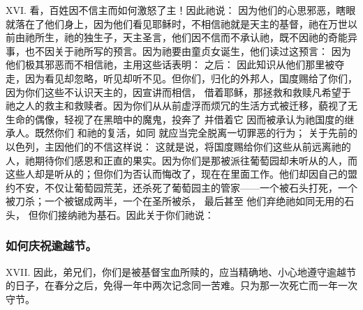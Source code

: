 XVI. 看，百姓因不信主而如何激怒了主！因此祂说： 因为他们的心思邪恶，瞎眼就落在了他们身上，因为他们看见耶稣时，不相信祂就是天主的基督，祂在万世以前由祂所生，祂的独生子，天主圣言，他们因不信而不承认祂，既不因祂的奇能异事，也不因关于祂所写的预言。因为祂要由童贞女诞生，他们读过这预言： 因为他们极其邪恶而不相信祂，主用这些话表明： 之后： 因此知识从他们那里被夺走，因为看见却忽略，听见却听不见。但你们，归化的外邦人，国度赐给了你们，因为你们这些不认识天主的，因宣讲而相信， 借着耶稣，那拯救和救赎凡希望于祂之人的救主和救赎者。因为你们从从前虚浮而烦冗的生活方式被迁移，藐视了无生命的偶像，轻视了在黑暗中的魔鬼，投奔了 并借着它 因而被承认为祂国度的继承人。既然你们 和祂的复活，如同 就应当完全脱离一切罪恶的行为； 关于先前的以色列，主因他们的不信这样说： 这就是说，将国度赐给你们这些从前远离祂的人，祂期待你们感恩和正直的果实。因为你们是那被派往葡萄园却未听从的人，而这些人却是听从的；但你们为否认而悔改了，现在在里面工作。他们却因自己的盟约不安，不仅让葡萄园荒芜，还杀死了葡萄园主的管家——一个被石头打死，一个被刀杀；一个被锯成两半，一个在圣所被杀， 最后甚至 他们弃绝祂如同无用的石头， 但你们接纳祂为基石。因此关于你们祂说：\par


\subsubsection{如何庆祝逾越节。}

XVII. 因此，弟兄们，你们是被基督宝血所赎的，应当精确地、小心地遵守逾越节的日子，在春分之后，免得一年中两次记念同一苦难。只为那一次死亡而一年一次守节。\par

